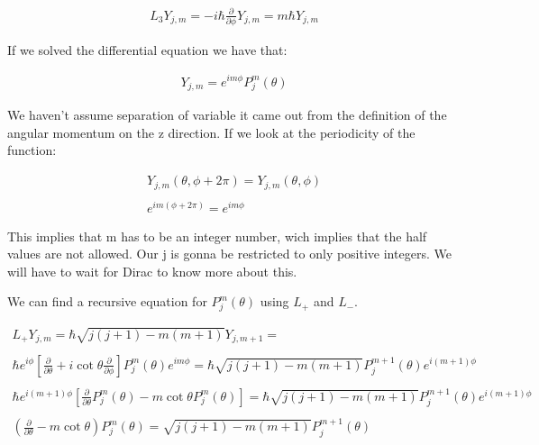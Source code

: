 \begin{equation}
  \begin{array}{c}
    L_3 Y_{j,m} = -i\hbar\frac{\partial}{\partial \phi}Y_{j,m} = m\hbar Y_{j,m}
  \end{array}
\end{equation}

If we solved the differential equation we have that:

\begin{equation}
  \begin{array}{c}
    Y_{j,m} = e^{im\phi}P_j^m(\theta)
  \end{array}
\end{equation}

We haven't assume separation of variable it came out from the definition of the angular momentum on the z direction. If we look at the periodicity of the function:

\begin{equation}
  \begin{array}{c}
    Y_{j,m}(\theta,\phi+2\pi) = Y_{j,m}(\theta,\phi)
    \\

    \\
    e^{im(\phi+2\pi)} = e^{im\phi}
  \end{array}
\end{equation}

This implies that m has to be an integer number, wich implies that the half values are not allowed. Our j is gonna be restricted to only positive integers. We will have to wait for Dirac to know more about this.

We can find a recursive equation for $P_j^m(\theta)$ using $L_+$ and $L_-$.

\begin{equation}
  \begin{array}{c}
    L_+ Y_{j,m} = \hbar \sqrt{j(j+1)-m(m+1)}Y_{j,m+1} =
    \\

    \\
    \hbar e^{i\phi}\left[\frac{\partial}{\partial \theta}+i\cot\theta\frac{\partial}{\partial \phi}\right]P_j^m(\theta)e^{im\phi} = \hbar\sqrt{j(j+1)-m(m+1)}P_j^{m+1}(\theta)e^{i(m+1)\phi}
    \\

    \\
    \hbar e^{i(m+1)\phi} \left[\frac{\partial}{\partial \theta}P_j^m(\theta) -m\cot{\theta}P_j^m(\theta)\right] = \hbar\sqrt{j(j+1)-m(m+1)}P_j^{m+1}(\theta)e^{i(m+1)\phi}
    \\

    \\
    \left(\frac{\partial}{\partial\theta}-m\cot\theta\right)P_j^m(\theta) = \sqrt{j(j+1)-m(m+1)}P_j^{m+1}(\theta)
  \end{array}
\end{equation}

